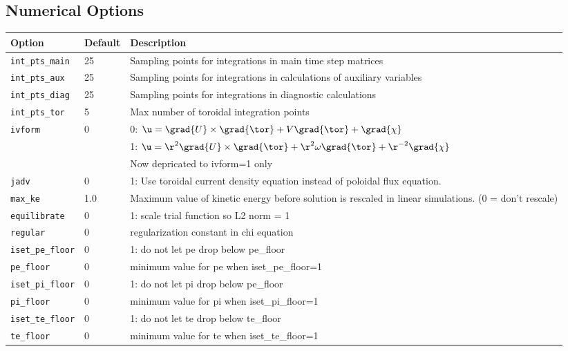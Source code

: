 \subsection{Numerical Options}
\begin{tabular}{llp{4in}}
  \textbf{Option}&\textbf{Default}&\textbf{Description}\\
  \hline
 \texttt{int\_pts\_main}  & 25 & Sampling points for integrations in
                                main time step matrices\\
  \texttt{int\_pts\_aux}   & 25 & Sampling points for integrations in
                                calculations of auxiliary variables\\
  \texttt{int\_pts\_diag}  & 25 & Sampling points for integrations in
                                diagnostic calculations\\
  \texttt{int\_pts\_tor}   & 5 & Max number of toroidal integration points \\
  \texttt{ivform} & 0   & 0: $\u = \grad{U}\times\grad{\tor} + V
   \grad{\tor} + \grad{\chi}$\\
   & & 1: $\u = \r^2 \grad{U}\times\grad{\tor} + \r^2 \omega
   \grad{\tor} + \r^{-2} \grad{\chi}$\\
   & & Now depricated to ivform=1 only \\
  \texttt{jadv}   & 0   & 1: Use toroidal current density equation
                          instead of poloidal flux equation.\\
  \texttt{max\_ke}& 1.0  & Maximum value of kinetic energy before solution is
                          rescaled in linear simulations. (0 = don't rescale)\\
  \texttt{equilibrate} & 0 & 1: scale trial function so L2 norm = 1 \\
  \texttt{regular}     & 0 & regularization constant in chi equation \\
  \texttt{iset\_pe\_floor} & 0 & 1: do not let pe drop below pe\_floor \\
  \texttt{pe\_floor}       & 0 & minimum value for pe when iset\_pe\_floor=1 \\

 \texttt{iset\_pi\_floor} & 0 & 1: do not let pi drop below pe\_floor \\
  \texttt{pi\_floor}	   & 0 & minimum value for pi when iset\_pi\_floor=1 \\

 \texttt{iset\_te\_floor} & 0 & 1: do not let te drop below te\_floor \\
  \texttt{te\_floor}	   & 0 & minimum value for te when iset\_te\_floor=1 \\


\end{tabular}
